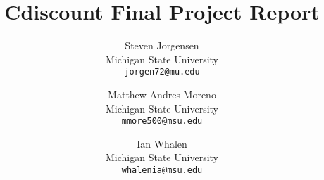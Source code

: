 \documentclass[10pt,twocolumn,letterpaper]{article}
\begin{document}
\title{Cdiscount Final Project Report}

\author{Steven Jorgensen\\
Michigan State University \\
{\tt\small jorgen72@mu.edu}
\and
Matthew Andres Moreno\\
Michigan State University\\
{\tt\small mmore500@msu.edu}
\and
Ian Whalen\\
Michigan State University \\
{\tt\small whalenia@msu.edu}
}


\maketitle














{\small


}
\end{document}
